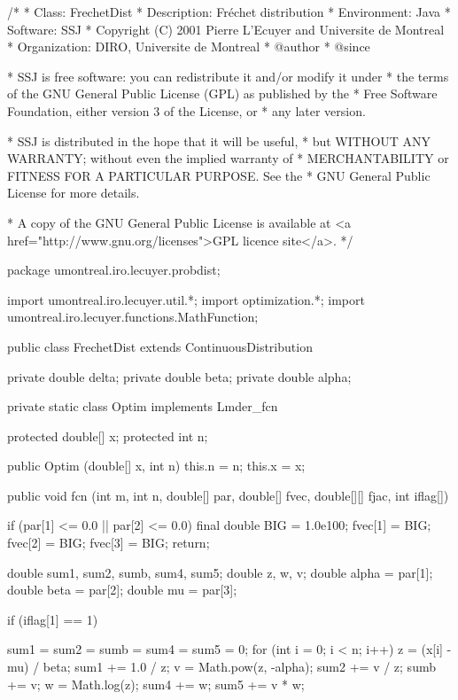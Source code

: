\begin{code}
\begin{hide}
/*
 * Class:        FrechetDist
 * Description:  Fréchet distribution
 * Environment:  Java
 * Software:     SSJ 
 * Copyright (C) 2001  Pierre L'Ecuyer and Universite de Montreal
 * Organization: DIRO, Universite de Montreal
 * @author       
 * @since

 * SSJ is free software: you can redistribute it and/or modify it under
 * the terms of the GNU General Public License (GPL) as published by the
 * Free Software Foundation, either version 3 of the License, or
 * any later version.

 * SSJ is distributed in the hope that it will be useful,
 * but WITHOUT ANY WARRANTY; without even the implied warranty of
 * MERCHANTABILITY or FITNESS FOR A PARTICULAR PURPOSE.  See the
 * GNU General Public License for more details.

 * A copy of the GNU General Public License is available at
   <a href="http://www.gnu.org/licenses">GPL licence site</a>.
 */
\end{hide}
package umontreal.iro.lecuyer.probdist;
\begin{hide}
import umontreal.iro.lecuyer.util.*;
import optimization.*;
import umontreal.iro.lecuyer.functions.MathFunction;
\end{hide}
public class FrechetDist extends ContinuousDistribution\begin{hide} {
   private double delta;
   private double beta;
   private double alpha;


   private static class Optim implements Lmder_fcn {
      protected double[] x;
      protected int n;

      public Optim (double[] x, int n) {
         this.n = n;
         this.x = x;
      }

      public void fcn (int m, int n, double[] par, double[] fvec, double[][] fjac, int iflag[])
      {
         if (par[1] <= 0.0 || par[2] <= 0.0) {
            final double BIG = 1.0e100;
            fvec[1] = BIG;
            fvec[2] = BIG;
            fvec[3] = BIG;
            return;
         }

         double sum1, sum2, sumb, sum4, sum5;
         double z, w, v;
         double alpha = par[1];
         double beta = par[2];
         double mu = par[3];

         if (iflag[1] == 1) {
            sum1 = sum2 = sumb = sum4 = sum5 = 0;
            for (int i = 0; i < n; i++) {
               z = (x[i] - mu) / beta;
               sum1 += 1.0 / z;
               v = Math.pow(z, -alpha);
               sum2 += v / z;
               sumb += v;
               w = Math.log(z);
               sum4 += w;
               sum5 += v * w;
            }

}}}}
\end{hide}
\end{code}
